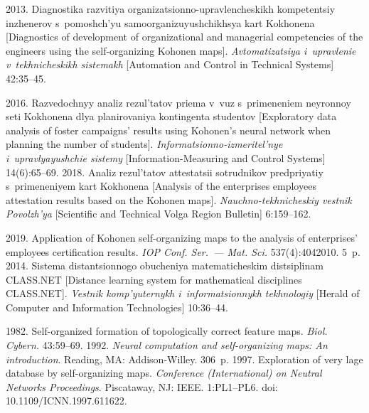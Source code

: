 \begin{multicols}{2}
{{\begin{thebibliography}{99}
 2013. Diagnostika razvitiya  
organizatsionno-upravlencheskikh kompetentsiy inzhenerov s~pomoshch'yu 
samoorganizuyushchikhsya kart Kokhonena [Diagnostics of development of organizational and 
managerial competencies of the engineers using the self-organizing Kohonen maps]. 
\textit{Avtomatizatsiya i~upravlenie v~tekhnicheskikh sistemakh} [Automation and Control in 
Technical Systems] 42:35--45.

 2016. Razvedochnyy analiz 
rezul'tatov priema v~vuz s~primeneniem neyronnoy seti Kokhonena dlya planirovaniya 
kontingenta studentov [Exploratory data analysis of foster campaigns' results using 
Kohonen's neural network when planning the number of students].  
\textit{Informatsionno-izmeritel'nye i~upravlyayushchie sistemy} [Information-Measuring and 
Control Systems] 14(6):65--69.
2018. Analiz rezul'tatov attestatsii sotrudnikov 
predpriyatiy s~primeneniyem kart Kokhonena [Analysis of the enterprises employees attestation results based on the Kohonen maps]. 
\textit{Nauchno-tekhnicheskiy vestnik 
Povolzh'ya} [Scientific and Technical Volga Region Bulletin] 6:159--162.

 2019. Application of Kohonen self-organizing maps to 
the analysis of enterprises' employees certification results. \textit{IOP Conf. Ser.~--- 
Mat. Sci.} 537(4):4042010. 5~p.
 2014. Sistema 
distantsionnogo obucheniya ma\-te\-ma\-ti\-che\-skim distsiplinam CLASS.NET [Distance learning 
system for mathematical disciplines CLASS.NET]. \textit{Vestnik komp'yuternykh 
i~informatsionnykh tekhnologiy} [Herald of Computer and Information Technologies]  
10:36--44.

 1982. Self-organized formation of topologically correct feature maps. 
\textit{Biol. Cybern.} 43:59--69.
 1992. \textit{Neural computation and  
self-organizing maps: An introduction}. Reading, MA: Addison-Willey. 306~p.
 1997. Exploration of very lage database by self-organizing maps.  \textit{Conference 
(International) on Neutral Networks Proceedings}. Piscataway, NJ: IEEE. 1:PL1--PL6. doi: 
10.1109/ICNN.1997.611622.


\end{thebibliography}

 }
 }

\end{multicols}

